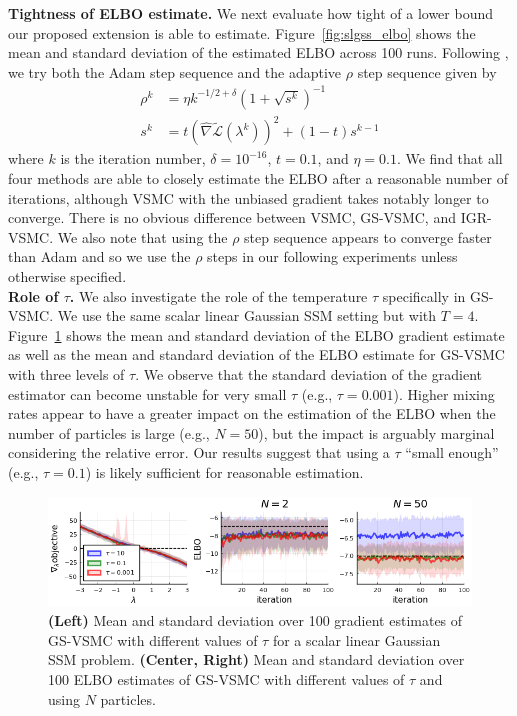 \documentclass[12pt]{article}
\newcommand{\vsmc}{\textsc{VSMC}\xspace}
\newcommand{\gsvsmc}{\textsc{GS-VSMC}\xspace}
\newcommand{\igrvsmc}{\textsc{IGR-VSMC}\xspace}
\newcommand{\elbo}{\textsc{ELBO}\xspace}
\newcommand{\ssm}{\textsc{SSM}\xspace}
\begin{document}
\textbf{Tightness of \elbo estimate.} We next evaluate how tight of a lower bound our proposed extension is able to estimate. Figure~\ref{fig:slgss_elbo} shows the mean and standard deviation of the estimated \elbo across 100 runs. Following \textcite{Naesseth:2018}, we try both the Adam step sequence and the adaptive $\rho$ step sequence \parencite{Kucukelbir:2017} given by
\begin{align*}
\rho^k &= \eta k^{-1/2+\delta}(1+\sqrt{s^k})^{-1} \\
s^k &= t\left(\hat{\nabla}\tilde{\mathcal{L}}(\lambda^k)\right)^2+(1-t)s^{k-1}
\end{align*}
where $k$ is the iteration number, $\delta=10^{-16}$, $t=0.1$, and $\eta=0.1$. We find that all four methods are able to closely estimate the \elbo after a reasonable number of iterations, although \vsmc with the unbiased gradient takes notably longer to converge. There is no obvious difference between \vsmc, \gsvsmc, and \igrvsmc. We also note that using the $\rho$ step sequence appears to converge faster than Adam and so we use the $\rho$ steps in our following experiments unless otherwise specified.
\\

\textbf{Role of $\tau$.} We also investigate the role of the temperature $\tau$ specifically in \gsvsmc. We use the same scalar linear Gaussian \ssm setting but with $T=4$. Figure~\ref{fig:tau_plots} shows the mean and standard deviation of the \elbo gradient estimate as well as the mean and standard deviation of the \elbo estimate for \gsvsmc with three levels of $\tau$. We observe that the standard deviation of the gradient estimator can become unstable for very small $\tau$ (e.g., $\tau=0.001$). Higher mixing rates appear to have a greater impact on the estimation of the \elbo when the number of particles is large (e.g., $N=50$), but the impact is arguably marginal considering the relative error. Our results suggest that using a $\tau$ ``small enough'' (e.g., $\tau=0.1$) is likely sufficient for reasonable estimation.

\begin{figure}[t]
\centering
\includegraphics[width=\textwidth]{figures/tau_plots.png}
\caption{\textbf{(Left)} Mean and standard deviation over 100 gradient estimates of \gsvsmc with different values of $\tau$ for a scalar linear Gaussian \ssm problem. \textbf{(Center, Right)} Mean and standard deviation over 100 \elbo estimates of \gsvsmc with different values of $\tau$ and using $N$ particles.}
\label{fig:tau_plots}
\end{figure}
\end{document}
